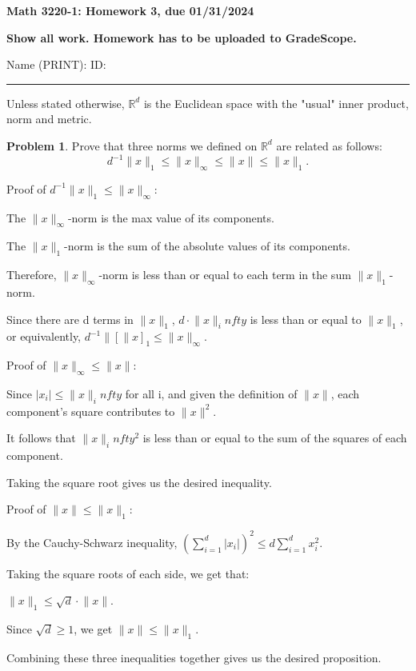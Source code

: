 \documentclass{amsart}
\theoremstyle{definition}
\newtheorem{xca}{Problem}
\newcommand{\R}{\mathbb{R}}
\newcommand{\norm}[1]{\lVert#1\rVert}
\newcommand{\lskip}{\newpage}
\begin{document}
\centerline{ \bf Math 3220-1: Homework 3, due 01/31/2024 }
\bigskip
\centerline{ \bf Show all work. Homework has to be uploaded to GradeScope.}
\bigskip
\noindent Name (PRINT):\hskip 2.5in ID:
\smallskip

\hrule

\bigskip
Unless stated otherwise, $\R^d$ is the Euclidean space with the "usual" inner product, norm and metric.

\bigskip

\begin{xca}
Prove that three norms we  defined on $\R^d$ are related as follows:
$$
d^{-1}\norm{x}_1\leq \norm{x}_\infty\leq \norm{x}\leq \norm{x}_1.
$$
\end{xca}

Proof of $d^{-1}\norm x_1 \leq \norm x_{\infty}$:

The $\norm{x}_\infty$-norm is the max value of its components.

The $\norm{x}_1$-norm is the sum of the absolute values of its components.

Therefore, $\norm{x}_\infty$-norm is less than or equal to each term
in the sum $\norm{x}_1$-norm.

Since there are d terms in $\norm{x}_1$, $d \cdot \norm{x}_infty$ is less than or equal
to $\norm{x}_1$, or equivalently, $d^{-1} \norm[x]_1 \leq \norm{x}_\infty$.


Proof of $\norm x_{\infty} \leq \norm x$:

Since $|x_i| \leq \norm{x}_infty$ for all i, and given the definition of $\norm{x}$,
each component's square contributes to $\norm{x}^2$.

It follows that $\norm{x}_infty^2$ is less than or equal to the sum of the squares of
each component.

Taking the square root gives us the desired inequality.


Proof of $\norm x \leq \norm x_1$:

By the Cauchy-Schwarz inequality, $\left(\sum_{i=1}^d |x_i|\right)^2 \leq d \sum_{i=1}^d x_i^2$.

Taking the square roots of each side, we get that:

$\norm{x}_1 \leq \sqrt{d} \cdot \norm{x}$.

Since $\sqrt{d} \geq 1$, we get $\norm{x} \leq \norm{x}_1$.


Combining these three inequalities together gives us the desired proposition.


\lskip
\end{document}
